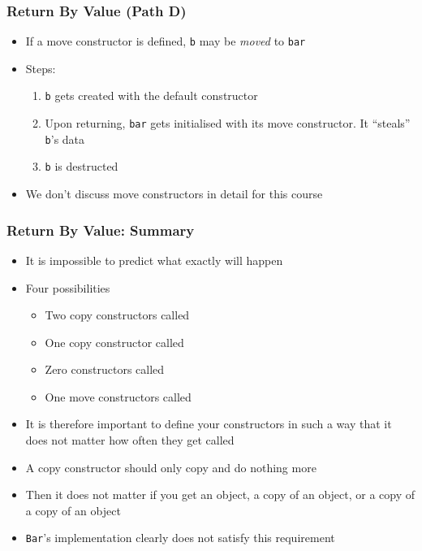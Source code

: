 \begin{frame}
  \frametitle{Return By Value (Path D)}
  \begin{itemize}
    \item If a move constructor is defined, {\tt b}
          may be \emph{moved} to {\tt bar}
    \item Steps:
          \begin{enumerate}
            \item {\tt b} gets created with the default constructor
            \item Upon returning, {\tt bar} gets initialised with its move constructor.
                  It ``steals'' {\tt b}'s data
            \item {\tt b} is destructed
          \end{enumerate}
    \item We don't discuss move constructors in detail for this course
  \end{itemize}
\end{frame}

\begin{frame}
  \frametitle{Return By Value: Summary}
  \begin{itemize}
    \item It is impossible to predict what exactly will happen
    \item Four possibilities
          \begin{itemize}
            \item Two copy constructors called
            \item One copy constructor called
            \item Zero constructors called
            \item One move constructors called
          \end{itemize}
    \item It is therefore important to define your constructors in such a way
          that it does not matter how often they get called
    \item A copy constructor should only copy and do nothing more
    \item Then it does not matter if you get an object, a copy of an object, or a copy of a copy of an object
    \item {\tt Bar}'s implementation clearly does not satisfy this requirement
  \end{itemize}
\end{frame}

